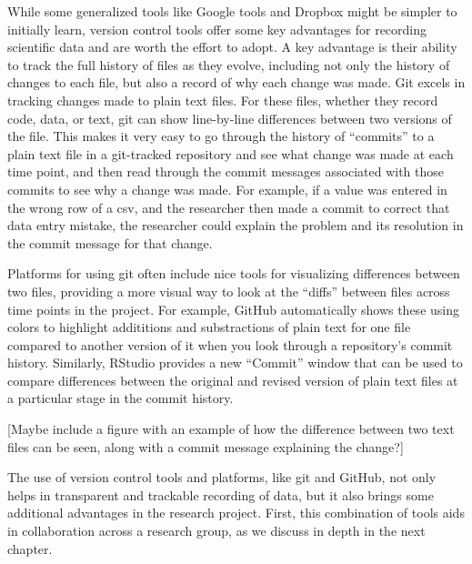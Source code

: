 \documentclass[]{tufte-book}
\begin{document}
While some generalized tools like Google tools and Dropbox might be simpler to
initially learn, version control tools offer some key advantages for recording
scientific data and are worth the effort to adopt. A key advantage is their
ability to track the full history of files as they evolve, including not only
the history of changes to each file, but also a record of why each change was
made. Git excels in tracking changes made to plain text
files. For these files, whether they record code, data, or text, git can show
line-by-line differences between two versions of the file. This makes it very
easy to go through the history of ``commits'' to a plain text file in a
git-tracked repository and see what change was made at each time point, and then
read through the commit messages associated with those commits to see why a
change was made. For example, if a value was entered in the wrong row of a csv,
and the researcher then made a commit to correct that data entry mistake, the
researcher could explain the problem and its resolution in the commit message
for that change.

Platforms for using git often include nice tools for visualizing differences
between two files, providing a more visual way to look at the ``diffs'' between
files across time points in the project. For example, GitHub automatically shows
these using colors to highlight addititions and substractions of plain text for
one file compared to another version of it when you look through a repository's
commit history. Similarly, RStudio provides a new ``Commit'' window that can be
used to compare differences between the original and revised version of plain
text files at a particular stage in the commit history.

{[}Maybe include a figure with an example of how the difference between two
text files can be seen, along with a commit message explaining the change?{]}

The use of version control tools and platforms, like git and GitHub, not only
helps in transparent and trackable recording of data, but it also brings some
additional advantages in the research project. First, this combination of tools
aids in collaboration across a research group, as we discuss in depth in the next
chapter.
\end{document}
